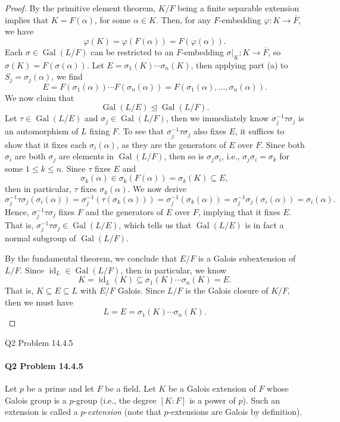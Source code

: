 \documentclass[12pt]{article}
\newenvironment{fullbox}{\begin{lrbox}{\savefullbox}\begin{minipage}{\dimexpr\textwidth-2\fboxsep\relax}}{\end{minipage}\end{lrbox}\begin{center}\framebox[\textwidth]{\usebox{\savefullbox}}\end{center}}
\newenvironment{pbox}[1][]{\begin{fullbox}\ifx#1\empty\else\paragraph{#1}\fi}{\end{fullbox}}
\renewcommand{\phi}{\varphi}
\newcommand{\<}{\langle}
\renewcommand{\>}{\rangle}
\newcommand{\clo}{\overline}
\DeclareMathOperator{\id}{id}
\DeclareMathOperator{\Gal}{Gal}
\newcommand{\teq}{\trianglelefteq}
\begin{document}
\begin{proof}
    

    By the primitive element theorem, $K/F$ being a finite separable extension  implies that $K = F(\alpha)$, for some $\alpha \in K$. Then, for any $F$-embedding $\phi : K \to \clo{F}$, we have
    \[
        \phi(K) = \phi(F(\alpha)) = F(\phi(\alpha)).
    \]
    Each $\sigma \in \Gal(L/F)$ can be restricted to an $F$-embedding $\sigma|_{K} : K \to \clo{F}$, so $\sigma(K) = F(\sigma(\alpha))$. Let $E = \sigma_1(K) \cdots \sigma_n(K)$, then applying part (a) to $S_j = \sigma_j(\alpha)$, we find
    \[
        E
            = F(\sigma_1(\alpha)) \cdots F(\sigma_n(\alpha))
            = F(\sigma_1(\alpha), \dots, \sigma_n(\alpha)).
    \]
    We now claim that
    \[
        \Gal(L/E) \teq \Gal(L/F).
    \]
    Let $\tau \in \Gal(L/E)$ and $\sigma_j \in \Gal(L/F)$, then we immediately know $\sigma_j^{-1}\tau\sigma_j$ is an automorphism of $L$ fixing $F$. To see that $\sigma_j^{-1}\tau\sigma_j$ also fixes $E$, it suffices to show that it fixes each $\sigma_i(\alpha)$, as they are the generators of $E$ over $F$. Since both $\sigma_i$ are both $\sigma_j$ are elements in $\Gal(L/F)$, then so is $\sigma_j\sigma_i$, i.e., $\sigma_j\sigma_i = \sigma_k$ for some $1 \leq k \leq n$. Since $\tau$ fixes $E$ and
    \[
        \sigma_k(\alpha) \in \sigma_k(F(\alpha)) = \sigma_k(K) \subseteq E,
    \]
    then in particular, $\tau$ fixes $\sigma_k(\alpha)$. We now derive
    \[
        \sigma_j^{-1}\tau\sigma_j(\sigma_i(\alpha))
            = \sigma_j^{-1}(\tau(\sigma_k(\alpha)))
            = \sigma_j^{-1}(\sigma_k(\alpha))
            = \sigma_j^{-1}\sigma_j(\sigma_i(\alpha))
            = \sigma_i(\alpha).
    \]
    Hence, $\sigma_j^{-1}\tau\sigma_j$ fixes $F$ and the generators of $E$ over $F$, implying that it fixes $E$. That is, $\sigma_j^{-1}\tau\sigma_j \in \Gal(L/E)$, which tells us that $\Gal(L/E)$ is in fact a normal subgroup of $\Gal(L/F)$.
    
    By the fundamental theorem, we conclude that $E/F$ is a Galois subextension of $L/F$. Since $\id_L \in \Gal(L/F)$, then in particular, we know
    \[
        K = \id_L(K) \subseteq \sigma_1(K) \cdots \sigma_n(K) = E.
    \]
    That is, $K \subseteq E \subseteq L$ with $E/F$ Galois. Since $L/F$ is the Galois closure of $K/F$, then we must have
    \[
        L = E = \sigma_1(K) \cdots \sigma_n(K).
    \]


\end{proof}


\newpage
\begin{pbox}[Q2 Problem 14.4.5]
    Let $p$ be a prime and let $F$ be a field. Let $K$ be a Galois extension of $F$ whose Galois group is a $p$-group (i.e., the degree $[K : F]$ is a power of $p$). Such an extension is called a $p$-\textit{extension} (note that $p$-extensions are Galois by definition).
\end{pbox}
\end{document}
